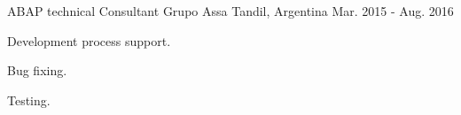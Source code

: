 \begin{cventries}
\cventry
{ABAP technical Consultant} %
{Grupo Assa} %
{Tandil, Argentina} %
{Mar. 2015 - Aug. 2016} %
{ %
\begin{cvitems}
\item {Development process support.}
\item {Bug fixing.}
\item {Testing.}
\end{cvitems}
}

\end{cventries}
